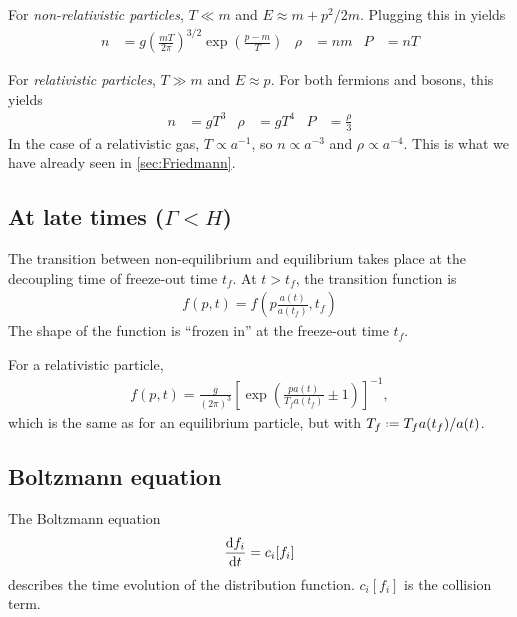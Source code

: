For \emph{non-relativistic particles}, $T \ll m$ and $E \approx m + p^2/2m$. Plugging this in yields
\begin{align*}
	n &= g \left( \frac{m T}{2 \pi} \right)^{3/2} \exp\left( \frac{p-m}{T} \right)&
	\rho &= n m&
	P &= n T
\end{align*}

For \emph{relativistic particles}, $T \gg m$ and $E \approx p$. For both fermions and bosons, this yields
\begin{align*}
	n &= g T^3&
	\rho &= g T^4&
	P &= \frac{\rho}{3}
\end{align*}
In the case of a relativistic gas, $T \propto a^{-1}$, so $n \propto a^{-3}$ and $\rho \propto a^{-4}$. This is what we have already seen in \cref{sec:Friedmann}.




\subsection{At late times ($\Gamma < H$)}
\label{ssec:late-times}
The transition between non-equilibrium and equilibrium takes place at the decoupling time of freeze-out time $t_f$. At $t>t_f$, the transition function is
\begin{align*}
	f(p,t) = f\left( p \frac{a(t)}{a(t_f)}, t_f \right)
\end{align*}
The shape of the function is \enquote{frozen in} at the freeze-out time $t_f$.

For a relativistic particle,
\begin{align*}
	f(p,t) =
	 \frac{g}{(2\pi)^3} \left[ \exp\left( 
		\frac{p a(t)}{T_f a(t_f)} \pm 1
	 	\right) \right]^{-1},
\end{align*}
which is the same as for an equilibrium particle, but with $T_f \defeq T_f a(t_f)/a(t)$.



\subsection{Boltzmann equation}
\label{ssec:boltzmann}
The Boltzmann equation
\begin{align*}
	\dv{f_i}{t} = c_i[f_i]
\end{align*}
describes the time evolution of the distribution function. $c_i[f_i]$ is the collision term.

